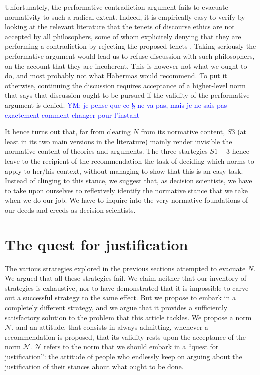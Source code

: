 \documentclass[preprint, french, english, 11pt, authoryear]{elsarticle}%
\newcommand{\commentYM}[1]{\textcolor{blue}{YM: #1}}
\newcommand{\adv}{\mathscr{N}}
\begin{document}
Unfortunately, the performative contradiction argument fails to evacuate normativity to such a radical extent. Indeed, it is empirically easy to verify by looking at the relevant literature that the tenets of discourse ethics are not accepted by all philosophers, some of whom explicitely denying that they are performing a contradiction by rejecting the proposed tenets \citep{heath_communicative_2001}. Taking seriously the performative argument would lead us to refuse discussion with such philosophers, on the account that they are incoherent. This is however not what we ought to do, and most probably not what Habermas would recommend. To put it otherwise, continuing the discussion requires acceptance of a higher-level norm that says that discussion ought to be pursued if the validity of the performative argument is denied. \commentYM{je pense que ce § ne va pas, mais je ne sais pas exactement comment changer pour l'instant}

It hence turns out that, far from clearing $N$ from its normative content, $S3$ (at least in its two main versions in the literature) mainly render invisible the normative content of theories and arguments. The three startegies $S1-3$ hence leave to the recipient of the recommendation the task of deciding which norms to apply to her/his context, without managing to show that this is an easy task. 
Instead of clinging to this stance, we suggest that, as decision scientists, we have to take upon ourselves to reflexively identify the normative stance that we take when we do our job. We have to inquire into the very normative foundations of our deeds and creeds as decision scientists. 

\section{The quest for justification}
The various strategies explored in the previous sections attempted to evacuate $N$. We argued that all these strategies fail. We claim neither that our inventory of strategies is exhaustive, nor to have demonstrated that it is impossible to carve out a successful strategy to the same effect. But we propose to embark in a completely different strategy, and we argue that it provides a sufficiently satisfactory solution to the problem that this article tackles. We propose a norm $\adv$, and an attitude, that consists in always admitting, whenever a recommendation is proposed, that its validity rests upon the acceptance of the norm $\adv$. $\adv$ refers to the norm that we should embark in a ``quest for justification'': the attitude of people who endlessly keep on arguing about the justification of their stances about what ought to be done.
\end{document}

